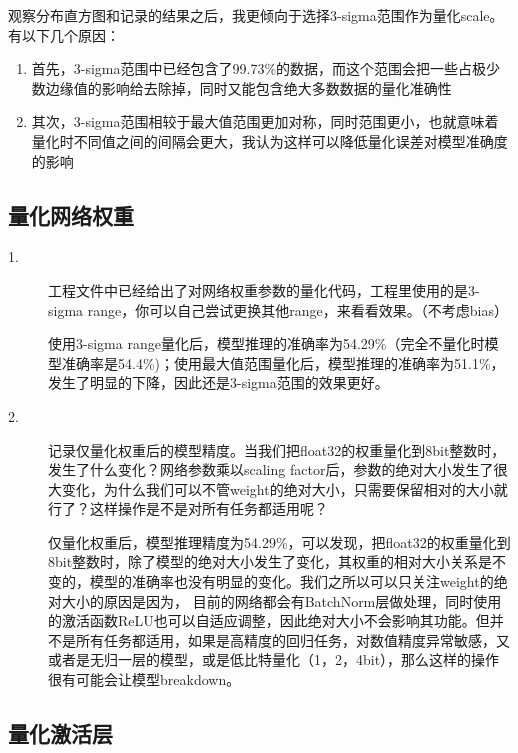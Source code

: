 \documentclass[UTF8]{ctexart}
\begin{document}
\begin{description}
    观察分布直方图和记录的结果之后，我更倾向于选择3-sigma范围作为量化scale。有以下几个原因：
    \begin{enumerate}
        \item 首先，3-sigma范围中已经包含了99.73\%的数据，而这个范围会把一些占极少数边缘值的影响给去除掉，同时又能包含绝大多数数据的量化准确性
        \item 其次，3-sigma范围相较于最大值范围更加对称，同时范围更小，也就意味着量化时不同值之间的间隔会更大，我认为这样可以降低量化误差对模型准确度的影响
    \end{enumerate}
\end{description}



\subsection{量化网络权重}
\begin{description}
    \item[1.]工程文件中已经给出了对网络权重参数的量化代码，工程里使用的是3-sigma range，你可以自己尝试更换其他range，来看看效果。（不考虑bias） 
    
    使用3-sigma range量化后，模型推理的准确率为54.29\%（完全不量化时模型准确率是54.4\%)；使用最大值范围量化后，模型推理的准确率为51.1\%，发生了明显的下降，因此还是3-sigma范围的效果更好。
    
    \item[2.]记录仅量化权重后的模型精度。当我们把float32的权重量化到8bit整数时，发生了什么变化？网络参数乘以scaling factor后，参数的绝对大小发生了很大变化，为什么我们可以不管weight的绝对大小，只需要保留相对的大小就行了？这样操作是不是对所有任务都适用呢？

    仅量化权重后，模型推理精度为54.29\%，可以发现，把float32的权重量化到8bit整数时，除了模型的绝对大小发生了变化，其权重的相对大小关系是不变的，模型的准确率也没有明显的变化。我们之所以可以只关注weight的绝对大小的原因是因为，
    目前的网络都会有BatchNorm层做处理，同时使用的激活函数ReLU也可以自适应调整，因此绝对大小不会影响其功能。但并不是所有任务都适用，如果是高精度的回归任务，对数值精度异常敏感，又或者是无归一层的模型，或是低比特量化（1，2，4bit），那么这样的操作很有可能会让模型breakdown。
\end{description}

\subsection{量化激活层}
\end{document}
